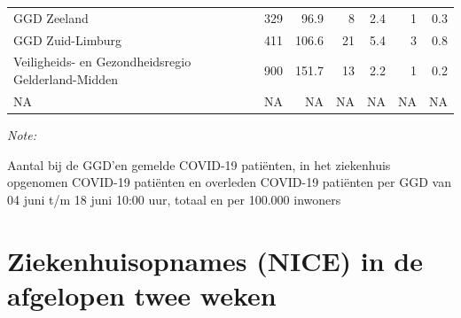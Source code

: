 \documentclass[
  english,
  man,floatsintext]{apa6}
\begin{document}
\begin{table}
\begin{threeparttable}
\begin{tabular}{lrrrrrr}
GGD Zeeland & 329 & 96.9 & 8 & 2.4 & 1 & 0.3\\
GGD Zuid-Limburg & 411 & 106.6 & 21 & 5.4 & 3 & 0.8\\
Veiligheids- en Gezondheidsregio Gelderland-Midden & 900 & 151.7 & 13 & 2.2 & 1 & 0.2\\
NA & NA & NA & NA & NA & NA & NA\\
\bottomrule
\end{tabular}
\begin{tablenotes}
\item \textit{Note: } 
\item Aantal bij de GGD’en gemelde COVID-19 patiënten, in het ziekenhuis opgenomen COVID-19 patiënten en overleden COVID-19 patiënten per GGD van 04 juni t/m 18 juni 10:00 uur, totaal en per 100.000 inwoners
\end{tablenotes}
\end{threeparttable}
\endgroup{}
\end{table}

\newpage

\hypertarget{ziekenhuisopnames-nice-in-de-afgelopen-twee-weken}{%
\section{Ziekenhuisopnames (NICE) in de afgelopen twee weken}\label{ziekenhuisopnames-nice-in-de-afgelopen-twee-weken}}
\end{document}
